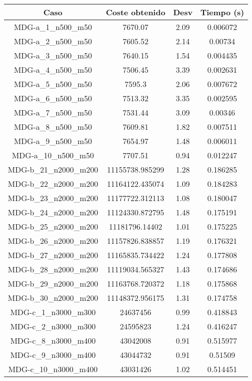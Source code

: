 \documentclass{article}
\begin{document}
\begin{table}[H]
	\centering
	\begin{tabular}{|cccc|}
		\hline
		Caso & Coste obtenido & Desv & Tiempo (s)\\ \hline
		MDG-a\_1\_n500\_m50 & 7670.07 & 2.09 & 0.006072\\
		MDG-a\_2\_n500\_m50 & 7605.52 & 2.14 & 0.00734\\
		MDG-a\_3\_n500\_m50 & 7640.15 & 1.54 & 0.004435\\
		MDG-a\_4\_n500\_m50 & 7506.45 & 3.39 & 0.002631\\
		MDG-a\_5\_n500\_m50 & 7595.3 & 2.06 & 0.007672\\
		MDG-a\_6\_n500\_m50 & 7513.32 & 3.35 & 0.002595\\
		MDG-a\_7\_n500\_m50 & 7531.44 & 3.09 & 0.00346\\
		MDG-a\_8\_n500\_m50 & 7609.81 & 1.82 & 0.007511\\
		MDG-a\_9\_n500\_m50 & 7654.97 & 1.48 & 0.006011\\
		MDG-a\_10\_n500\_m50 & 7707.51 & 0.94 & 0.012247\\
		MDG-b\_21\_n2000\_m200 & 11155738.985299 & 1.28 & 0.186285\\
		MDG-b\_22\_n2000\_m200 & 11164122.435074 & 1.09 & 0.184283\\
		MDG-b\_23\_n2000\_m200 & 11177722.312113 & 1.08 & 0.180047\\
		MDG-b\_24\_n2000\_m200 & 11124330.872795 & 1.48 & 0.175191\\
		MDG-b\_25\_n2000\_m200 & 11181796.14402 & 1.01 & 0.175225\\
		MDG-b\_26\_n2000\_m200 & 11157826.838857 & 1.19 & 0.176321\\
		MDG-b\_27\_n2000\_m200 & 11165835.734422 & 1.24 & 0.177808\\
		MDG-b\_28\_n2000\_m200 & 11119034.565327 & 1.43 & 0.174686\\
		MDG-b\_29\_n2000\_m200 & 11163768.720372 & 1.18 & 0.175868\\
		MDG-b\_30\_n2000\_m200 & 11148372.956175 & 1.31 & 0.174758\\
		MDG-c\_1\_n3000\_m300 & 24637456 & 0.99 & 0.418843\\
		MDG-c\_2\_n3000\_m300 & 24595823 & 1.24 & 0.416247\\
		MDG-c\_8\_n3000\_m400 & 43042008 & 0.91 & 0.515977\\
		MDG-c\_9\_n3000\_m400 & 43044732 & 0.91 & 0.51509\\
		MDG-c\_10\_n3000\_m400 & 43031426 & 1.02 & 0.514451\\

\end{tabular}
\end{table}
\end{document}
